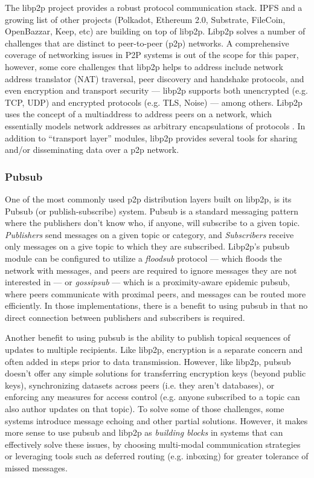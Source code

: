 \documentclass{textile}
\begin{document}
The libp2p project provides a robust protocol communication stack. IPFS and a growing list of other projects (Polkadot, Ethereum 2.0, Substrate, FileCoin, OpenBazzar, Keep, etc) are building on top of libp2p. Libp2p solves a number of challenges that are distinct to peer-to-peer (p2p) networks. A comprehensive coverage of networking issues in P2P systems is out of the scope for this paper, however, some core challenges that libp2p helps to address include network address translator \cite{srisureshIPNetworkAddress} (NAT) traversal, peer discovery and handshake protocols, and even encryption and transport security --- libp2p supports both unencrypted (e.g. TCP, UDP) and encrypted protocols (e.g. TLS, Noise) --- among others. Libp2p uses the concept of a multiaddress to address peers on a network, which essentially models network addresses as arbitrary encapsulations of protocols \cite{Multiaddr}. In addition to ``transport layer'' modules, libp2p provides several tools for sharing and/or disseminating data over a p2p network.

\subsubsection{Pubsub}

One of the most commonly used p2p distribution layers built on libp2p, is its Pubsub (or publish-subscribe) system. Pubsub is a standard messaging pattern where the publishers don't know who, if anyone, will subscribe to a given topic. \emph{Publishers} send messages on a given topic or category, and \emph{Subscribers} receive only messages on a give topic to which they are subscribed. Libp2p's pubsub module can be configured to utilize a \emph{floodsub} protocol --- which floods the network with messages, and peers are required to ignore messages they are not interested in --- or \emph{gossipsub} --- which is a proximity-aware epidemic pubsub, where peers communicate with proximal peers, and messages can be routed more efficiently. In those implementations, there is a benefit to using pubsub in that no direct connection between publishers and subscribers is required.

Another benefit to using pubsub is the ability to publish topical sequences of updates to multiple recipients. Like libp2p, encryption is a separate concern and often added in steps prior to data transmission. However, like libp2p, pubsub doesn't offer any simple solutions for transferring encryption keys (beyond public keys), synchronizing datasets across peers (i.e. they aren't databases), or enforcing any measures for access control (e.g. anyone subscribed to a topic can also author updates on that topic). To solve some of those challenges, some systems introduce message echoing and other partial solutions. However, it makes more sense to use pubsub and libp2p as \emph{building blocks} in systems that can effectively solve these issues, by choosing multi-modal communication strategies or leveraging tools such as deferred routing (e.g. inboxing) for greater tolerance of missed messages.
\end{document}
